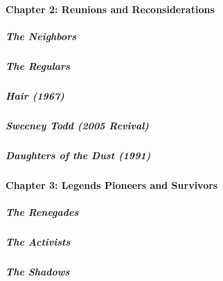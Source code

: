 \hypertarget{chapter-2-reunions-and-reconsiderations}{%
\paragraph{Chapter 2: Reunions and
Reconsiderations}\label{chapter-2-reunions-and-reconsiderations}}

\href{/interactive/2020/04/13/t-magazine/ninth-street-greenwich-village-neighbors.html}{}

\hypertarget{the-neighbors}{%
\subparagraph{The Neighbors}\label{the-neighbors}}

\href{/interactive/2020/04/13/t-magazine/omen-restaurant-nyc.html}{}

\hypertarget{the-regulars}{%
\subparagraph{The Regulars}\label{the-regulars}}

\href{/interactive/2020/04/13/t-magazine/hair-musical-broadway.html}{}

\hypertarget{hair-1967}{%
\subparagraph{Hair (1967)}\label{hair-1967}}

\href{/interactive/2020/04/13/t-magazine/sweeney-todd-revival.html}{}

\hypertarget{sweeney-todd-2005-revival}{%
\subparagraph{Sweeney Todd (2005
Revival)}\label{sweeney-todd-2005-revival}}

\href{/interactive/2020/04/13/t-magazine/daughters-of-the-dust.html}{}

\hypertarget{daughters-of-the-dust-1991}{%
\subparagraph{Daughters of the Dust
(1991)}\label{daughters-of-the-dust-1991}}

\hypertarget{chapter-3-legends-pioneers-and-survivors}{%
\paragraph{Chapter 3: Legends Pioneers and
Survivors}\label{chapter-3-legends-pioneers-and-survivors}}

\href{/interactive/2020/04/13/t-magazine/butch-stud-lesbian.html}{}

\hypertarget{the-renegades}{%
\subparagraph{The Renegades}\label{the-renegades}}

\href{/interactive/2020/04/13/t-magazine/act-up-aids.html}{}

\hypertarget{the-activists}{%
\subparagraph{The Activists}\label{the-activists}}

\href{/interactive/2020/04/13/t-magazine/artist-recluse.html}{}

\hypertarget{the-shadows}{%
\subparagraph{The Shadows}\label{the-shadows}}

